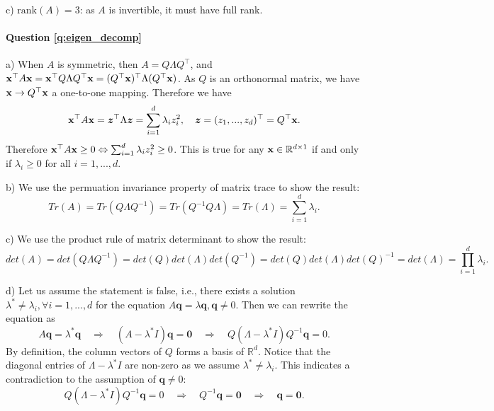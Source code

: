 c) $\text{rank}(A) = 3$: as $A$ is invertible, it must have full rank.

\paragraph{Question \ref{q:eigen_decomp}}

a) When $A$ is symmetric, then $A = Q \Lambda Q^\top$, and $\mathbf{x}^\top A \mathbf{x} = \mathbf{x}^\top Q \Lambda Q^\top \mathbf{x} = (Q^\top \mathbf{x})^\top \Lambda (Q^\top \mathbf{x})$. As $Q$ is an orthonormal matrix, we have $\mathbf{x} \rightarrow Q^\top \mathbf{x}$ a one-to-one mapping. Therefore we have
$$\mathbf{x}^\top A \mathbf{x} = \bm{z}^\top \Lambda \bm{z} = \sum_{i=1}^d \lambda_i z_i^2, \quad \bm{z} = (z_1, ..., z_d)^\top = Q^\top \mathbf{x}.$$
Therefore $\mathbf{x}^\top A \mathbf{x} \geq 0 \Leftrightarrow \sum_{i=1}^d \lambda_i z_i^2 \geq 0$. This is true for any $\mathbf{x} \in \mathbb{R}^{d \times 1}$ if and only if $\lambda_i \geq 0$ for all $i = 1,..., d$.

b) We use the permuation invariance property of matrix trace to show the result:
$$Tr(A) = Tr(Q \Lambda Q^{-1}) = Tr(Q^{-1} Q \Lambda) = Tr(\Lambda) = \sum_{i=1}^d \lambda_i.$$

c) We use the product rule of matrix determinant to show the result:
$$det(A) = det(Q \Lambda Q^{-1}) = det(Q) det(\Lambda) det(Q^{-1}) = det(Q) det(\Lambda) det(Q)^{-1} = det(\Lambda) = \prod_{i=1}^d \lambda_i.$$

d) Let us assume the statement is false, i.e., there exists a solution $\lambda^* \neq \lambda_i, \forall i = 1, ..., d$ for the equation $A \bm{q} = \lambda \bm{q}, \bm{q} \neq 0$. Then we can rewrite the equation as
$$A \bm{q} = \lambda^* \bm{q} \quad \Rightarrow \quad (A - \lambda^* I) \bm{q} = \bm{0} \quad \Rightarrow \quad Q (\Lambda - \lambda^* I) Q^{-1} \bm{q} = 0.$$
By definition, the column vectors of $Q$ forms a basis of $\mathbb{R}^d$. Notice that the diagonal entries of $\Lambda - \lambda^* I$ are non-zero as we assume $\lambda^* \neq \lambda_i$. This indicates a contradiction to the assumption of $\bm{q} \neq 0$:
$$Q (\Lambda - \lambda^* I) Q^{-1} \bm{q} = 0 \quad \Rightarrow \quad Q^{-1}\bm{q} = \bm{0} \quad \Rightarrow \quad \bm{q} = \bm{0}.$$

